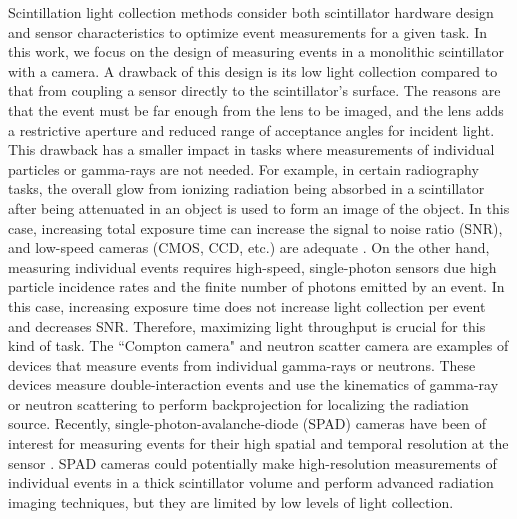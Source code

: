 Scintillation light collection methods consider both scintillator hardware design  
and sensor characteristics to optimize event measurements for a given task.
In this work, we focus on the design of measuring events in a monolithic 
scintillator with a camera.
A drawback of this design is its low light collection compared to that from 
coupling a sensor directly to the scintillator's surface.
The reasons are that the event must be far enough from the lens to be imaged, and 
the lens adds a restrictive aperture and reduced range of acceptance angles for 
incident light.
This drawback has a smaller impact in tasks where measurements of individual 
particles or gamma-rays are not needed.
For example, in certain radiography tasks, the overall glow from ionizing 
radiation being absorbed in a scintillator after being attenuated in an object is 
used to form an image of the object.
In this case, increasing total exposure time can increase the signal to 
noise ratio (SNR), and low-speed cameras (CMOS, CCD, etc.) are adequate \cite{pleinert1997design,baker2014scintillator,adams2017gamma,balasubramanian2022x,gustschin2024event}.
On the other hand, measuring individual events requires high-speed, single-photon 
sensors due high particle incidence rates and the finite number of photons emitted 
by an event.
In this case, increasing exposure time does not increase light collection per 
event and decreases SNR.
Therefore, maximizing light throughput is crucial for this kind of task.
The ``Compton camera" \cite{kataoka2013handy, hosokoshi2019development, llosa2019sipm, parajuli2022development, kim2024comprehensive} 
and neutron scatter camera \cite{mascarenhas2006development,marleau2007advances,mascarenhas2009results,weinfurther2018model} 
are examples of devices that measure events from individual gamma-rays or neutrons.
These devices measure double-interaction events and use the kinematics of 
gamma-ray or neutron scattering to perform backprojection for localizing the 
radiation source. %
Recently, single-photon-avalanche-diode (SPAD) cameras have been of interest for 
measuring events for their high spatial and temporal resolution at the sensor \cite{bocchieri2024scintillation}.
SPAD cameras could potentially make high-resolution measurements of individual 
events in a thick scintillator volume and perform advanced radiation imaging 
techniques, but they are limited by low levels of light collection.


